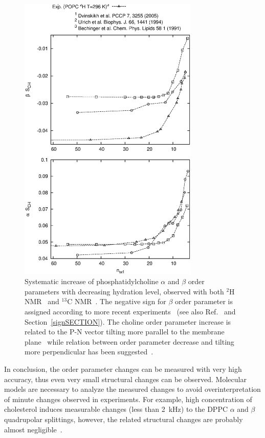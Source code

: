 \documentclass[aps,prl,superscriptaddress,twocolumn]{revtex4}
\begin{document}
\begin{figure}[]
  \includegraphics[width=8.6cm]{../Fig/OrderParameterDEHYDexp.eps}
\newline
  \caption{\label{opDEHYDeffect}
    Systematic increase of phosphatidylcholine $\alpha$ and $\beta$ order parameters with decreasing hydration level,
    observed with both $^2$H NMR~\cite{bechinger91,ulrich94} and $^{13}$C NMR~\cite{dvinskikh05b}.
    The negative sign for $\beta$ order parameter is assigned according to more recent experiments~\cite{hong95a,hong95b,gross97} 
    (see also Ref.~\cite{botan15} and Section~\ref{signSECTION}).
    The choline order parameter increase is related to the P-N vector tilting more parallel to the membrane plane~\cite{botan15}
    while relation between order parameter decrease and tilting more perpendicular has been suggested~\cite{scherer89}.
  } 
\end{figure}

In conclusion, the order parameter changes can be measured with very high accuracy,
thus even very small structural changes can be observed. Molecular models are necessary
to analyze the measured changes to avoid overinterpretation of minute changes observed in experiments.
For example, high concentration of cholesterol induces measurable changes (less than 2~kHz) to the DPPC $\alpha$ and $\beta$ 
quadrupolar splittings, however, the related structural changes are probably almost negligible~\cite{brown78,botan15}.
\end{document}
